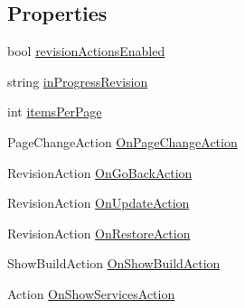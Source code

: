 \subsection*{Properties}
\begin{DoxyCompactItemize}
\item 
bool \mbox{\hyperlink{class_unity_editor_1_1_collab_history_window_add615e0b09468afea675e2851124cc49}{revision\+Actions\+Enabled}}
\item 
string \mbox{\hyperlink{class_unity_editor_1_1_collab_history_window_af4770e386e2756a72cc18fa123f9a84d}{in\+Progress\+Revision}}
\item 
int \mbox{\hyperlink{class_unity_editor_1_1_collab_history_window_a745e77e85001e4e18eb4ffbeea4f4be9}{items\+Per\+Page}}
\item 
Page\+Change\+Action \mbox{\hyperlink{class_unity_editor_1_1_collab_history_window_a0916d14a1e99e52080e4e2f3d40a26a0}{On\+Page\+Change\+Action}}
\item 
Revision\+Action \mbox{\hyperlink{class_unity_editor_1_1_collab_history_window_a4029f0522b8ea6e91830cafa9fd1a7c4}{On\+Go\+Back\+Action}}
\item 
Revision\+Action \mbox{\hyperlink{class_unity_editor_1_1_collab_history_window_a75939bc67d0eca3d62b8c7664deaa523}{On\+Update\+Action}}
\item 
Revision\+Action \mbox{\hyperlink{class_unity_editor_1_1_collab_history_window_a687625a3b8ed3d53ec7a892b214e6a21}{On\+Restore\+Action}}
\item 
Show\+Build\+Action \mbox{\hyperlink{class_unity_editor_1_1_collab_history_window_ac1e29e71b4e5fefa0bdab8634a9de7fe}{On\+Show\+Build\+Action}}
\item 
Action \mbox{\hyperlink{class_unity_editor_1_1_collab_history_window_a384a9264f55b1d399a80cbcd0b0d33c7}{On\+Show\+Services\+Action}}
\end{DoxyCompactItemize}


